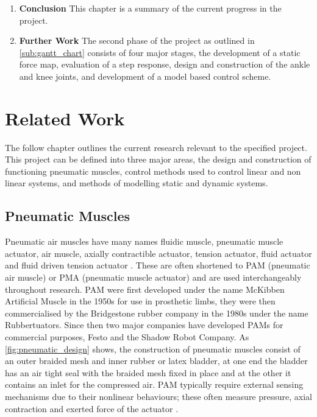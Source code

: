 \documentclass[11pt,a4paper]{article}
\begin{document}
\begin{enumerate}
\item \textbf{Conclusion} This chapter is a summary of the current progress in the project.
\item \textbf{Further Work} The second phase of the project as outlined in \cref{sub:gantt_chart} consists of four major stages, the development of a static force map, evaluation of a step response, design and construction of the ankle and knee joints, and development of a model based control scheme.
\end{enumerate}

\newpage
\section{Related Work}
\label{sec:related_work}

The follow chapter outlines the current research relevant to the specified project. This project can be defined into three major areas, the design and construction of functioning pneumatic muscles, control methods used to control linear and non linear systems, and methods of modelling static and dynamic systems. 

\subsection{Pneumatic Muscles}
\label{sub:pneumatic_muscles}
Pneumatic air muscles have many names fluidic muscle, pneumatic muscle actuator, air muscle, axially contractible actuator, tension actuator, fluid actuator and fluid driven tension actuator \cite{najmuddin_mustaffa_2017} \cite{lau_chai_2012}. These are often shortened to PAM (pneumatic air muscle) or PMA (pneumatic muscle actuator) and are used interchangeably throughout research. PAM were first developed under the name McKibben Artificial Muscle in the 1950s for use in prosthetic limbs, they were then commercialised by the Bridgestone rubber company in the 1980s under the name Rubbertuators. Since then two major companies have developed PAMs for commercial purposes, Festo and the Shadow Robot Company. As \cref{fig:pneumatic_design} shows, the construction of pneumatic muscles consist of an outer braided mesh and inner rubber or latex bladder, at one end the bladder has an air tight seal with the braided mesh fixed in place and at the other it contains an inlet for the compressed air. PAM typically require external sensing mechanisms due to their nonlinear behaviours; these often measure pressure, axial contraction and exerted force of the actuator \cite{erin_pol_valle_park_2016}. \newline
\end{document}
